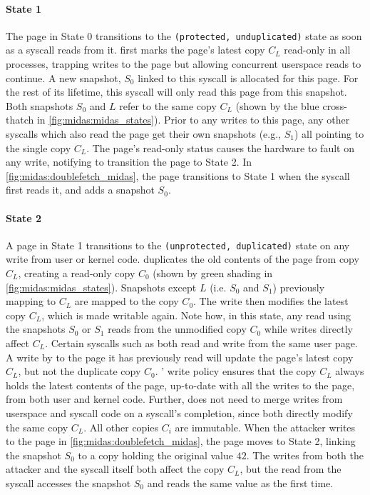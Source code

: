 \paragraph{State 1}
The page in State 0 transitions to the \texttt{(protected, unduplicated)} state as soon as a syscall
reads from it.
\midas first marks the page's latest copy $C_L$ read-only in all processes,
trapping writes to the page but allowing concurrent userspace reads to continue.
A new snapshot, $S_0$ linked to this syscall is allocated for this page.
For the rest of its lifetime, this syscall will only read this page from this snapshot.
Both snapshots $S_0$ and $L$ refer to the same copy $C_L$ (shown by the
blue cross-thatch in \autoref{fig:midas:midas_states}).
Prior to any writes to this page, any other syscalls which also read the page
get their own snapshots (e.g., $S_1$) all pointing to the single copy $C_L$.
The page's read-only status causes the hardware to fault on any write,
notifying \midas to transition the page to State 2.
In \autoref{fig:midas:doublefetch_midas}, the page transitions to State 1 when
the syscall first reads it, and adds a snapshot $S_0$.

\paragraph{State 2}
A page in State 1 transitions to the \texttt{(unprotected, duplicated)} state
on any write from user or kernel code.
\midas duplicates the old contents of the page from copy $C_L$, creating a
read-only copy $C_0$ (shown by green shading in \autoref{fig:midas:midas_states}).
Snapshots except $L$ (i.e. $S_0$ and $S_1$) previously mapping to $C_L$ are
mapped to the copy $C_0$.
The write then modifies the latest copy $C_L$, which is made writable again.
Note how, in this state, any read using the snapshots $S_0$ or $S_1$ reads
from the unmodified copy $C_0$ while writes directly affect $C_L$.
Certain syscalls such as  both read and write from
the same user page.
A write by  to the page it has previously read will update
the page's latest copy $C_L$, but not the duplicate copy $C_0$.
\midas' write policy ensures that the copy $C_L$ always holds the latest
contents of the page, up-to-date with all the writes to the page, from both user
and kernel code.
Further, \midas does not need to merge writes from userspace and syscall code
on a syscall's completion, since both directly modify the same copy $C_L$.
All other copies $C_i$ are immutable.
When the attacker writes to the page in \autoref{fig:midas:doublefetch_midas}, the
page moves to State 2, linking the snapshot $S_0$ to a copy holding the
original value $42$.
The writes from both the attacker and the syscall itself both affect
the copy $C_L$, but the read from the syscall accesses the snapshot $S_0$
and reads the same value as the first time.


